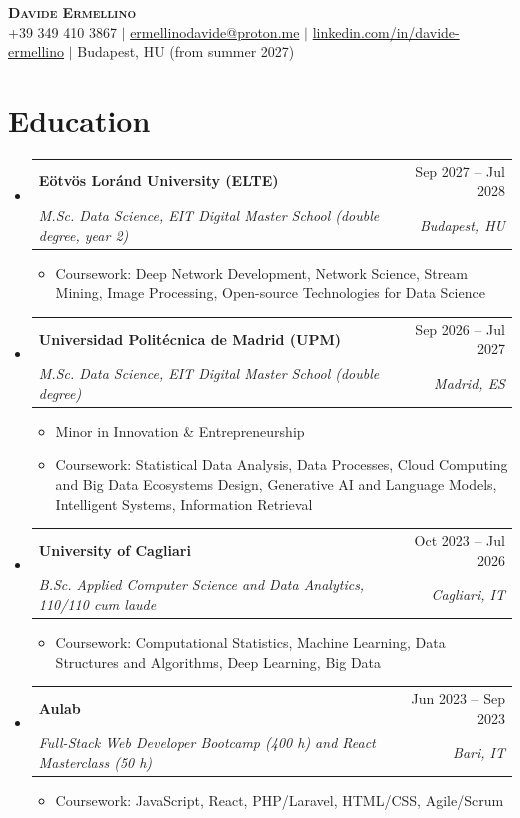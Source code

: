 \documentclass[a4paper,11pt]{article}
\makeatletter
\newcommand{\resumeItem}[1]{\item\small{{#1 \vspace{-2pt}}}}
\newcommand{\resumeSubheading}[4]{
  \vspace{-2pt}\item
    \begin{tabular*}{0.97\textwidth}[t]{l@{\extracolsep{\fill}}r}
      \textbf{#1} & #2 \\
      \textit{\small#3} & \textit{\small #4} \\
    \end{tabular*}\vspace{-7pt}
}
\newcommand{\resumeSubHeadingListStart}{\begin{itemize}[leftmargin=0.15in, label={}, itemsep=0pt, topsep=1pt]}
\newcommand{\resumeSubHeadingListEnd}{\end{itemize}}
\newcommand{\resumeItemListStart}{\begin{itemize}[leftmargin=0.2in, topsep=1pt, itemsep=0pt, parsep=0pt]}
\newcommand{\resumeItemListEnd}{\end{itemize}\vspace{-4pt}}
\makeatother
\begin{document}
\begin{center}
    \textbf{\Huge \scshape Davide Ermellino} \\ \vspace{1pt}
    \small +39 349 410 3867 $|$ \href{mailto:ermellinodavide@proton.me}{ermellinodavide@proton.me} $|$
    \href{https://www.linkedin.com/in/davide-ermellino/}{linkedin.com/in/davide-ermellino} $|$
    Budapest, HU (from summer 2027)
\end{center}

\section{Education}
  \resumeSubHeadingListStart
    \resumeSubheading
      {E\"otv\"os Lor\'and University (ELTE)}{Sep 2027 -- Jul 2028}
      {M.Sc. Data Science, EIT Digital Master School (double degree, year 2)}{Budapest, HU}
      \resumeItemListStart
        \resumeItem{Coursework: Deep Network Development, Network Science, Stream Mining, Image Processing, Open-source Technologies for Data Science}
      \resumeItemListEnd
    \resumeSubheading
      {Universidad Polit\'ecnica de Madrid (UPM)}{Sep 2026 -- Jul 2027}
      {M.Sc. Data Science, EIT Digital Master School (double degree)}{Madrid, ES}
      \resumeItemListStart
        \resumeItem{Minor in Innovation \& Entrepreneurship}
        \resumeItem{Coursework: Statistical Data Analysis, Data Processes, Cloud Computing and Big Data Ecosystems Design, Generative AI and Language Models, Intelligent Systems, Information Retrieval}
      \resumeItemListEnd
    \resumeSubheading
      {University of Cagliari}{Oct 2023 -- Jul 2026}
      {B.Sc. Applied Computer Science and Data Analytics, 110/110 cum laude}{Cagliari, IT}
      \resumeItemListStart
        \resumeItem{Coursework: Computational Statistics, Machine Learning, Data Structures and Algorithms, Deep Learning, Big Data}
      \resumeItemListEnd
    \resumeSubheading
      {Aulab}{Jun 2023 -- Sep 2023}
      {Full-Stack Web Developer Bootcamp (400 h) and React Masterclass (50 h)}{Bari, IT}
      \resumeItemListStart
        \resumeItem{Coursework: JavaScript, React, PHP/Laravel, HTML/CSS, Agile/Scrum}
      \resumeItemListEnd
  \resumeSubHeadingListEnd

\end{document}

